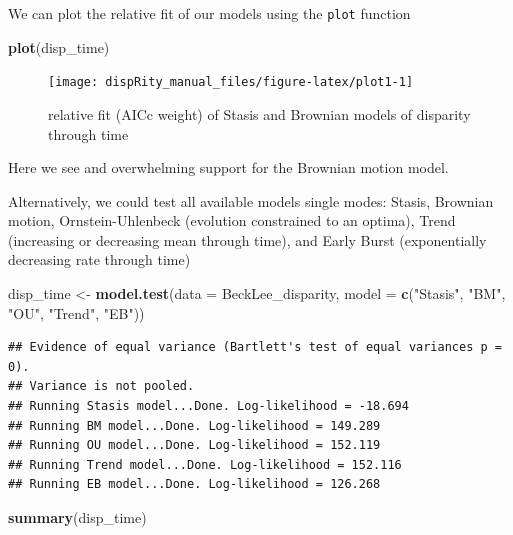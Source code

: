 \documentclass[]{book}
\newenvironment{Shaded}{\begin{snugshade}}{\end{snugshade}}
\newcommand{\DataTypeTok}[1]{\textcolor[rgb]{0.13,0.29,0.53}{#1}}
\newcommand{\KeywordTok}[1]{\textcolor[rgb]{0.13,0.29,0.53}{\textbf{#1}}}
\newcommand{\NormalTok}[1]{#1}
\newcommand{\StringTok}[1]{\textcolor[rgb]{0.31,0.60,0.02}{#1}}
\begin{document}
We can plot the relative fit of our models using the \texttt{plot} function

\begin{Shaded}
\begin{Highlighting}[]
\KeywordTok{plot}\NormalTok{(disp_time)}
\end{Highlighting}
\end{Shaded}

\begin{figure}

{\centering \texttt{[image: dispRity\_manual\_files/figure-latex/plot1-1]} 

}

\caption{relative fit (AICc weight) of Stasis and Brownian models of disparity through time}\label{fig:plot1}
\end{figure}

Here we see and overwhelming support for the Brownian motion model.

Alternatively, we could test all available models single modes: Stasis, Brownian motion, Ornstein-Uhlenbeck (evolution constrained to an optima), Trend (increasing or decreasing mean through time), and Early Burst (exponentially decreasing rate through time)

\begin{Shaded}
\begin{Highlighting}[]
\NormalTok{disp_time <-}\StringTok{ }\KeywordTok{model.test}\NormalTok{(}\DataTypeTok{data =}\NormalTok{ BeckLee_disparity,}
                  \DataTypeTok{model =} \KeywordTok{c}\NormalTok{(}\StringTok{"Stasis"}\NormalTok{, }\StringTok{"BM"}\NormalTok{, }\StringTok{"OU"}\NormalTok{, }\StringTok{"Trend"}\NormalTok{, }\StringTok{"EB"}\NormalTok{))}
\end{Highlighting}
\end{Shaded}

\begin{verbatim}
## Evidence of equal variance (Bartlett's test of equal variances p = 0).
## Variance is not pooled.
## Running Stasis model...Done. Log-likelihood = -18.694
## Running BM model...Done. Log-likelihood = 149.289
## Running OU model...Done. Log-likelihood = 152.119
## Running Trend model...Done. Log-likelihood = 152.116
## Running EB model...Done. Log-likelihood = 126.268
\end{verbatim}

\begin{Shaded}
\begin{Highlighting}[]
\KeywordTok{summary}\NormalTok{(disp_time)}
\end{Highlighting}
\end{Shaded}
\end{document}
